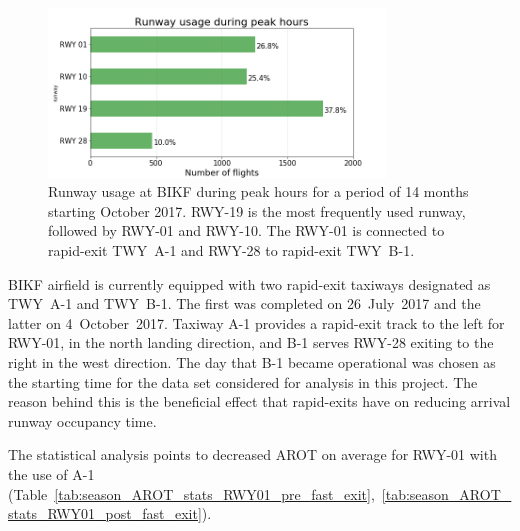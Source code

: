\begin{figure}[h]
    \centering
    \includegraphics[width=0.8\textwidth]{graphics/fig_runway_usage_peak.png}
    \caption[Runway usage at BIKF during peak hours]{Runway usage at BIKF during peak hours for a period of 14 months starting October 2017. RWY-19 is the most frequently used runway, followed by RWY-01 and RWY-10. The RWY-01 is connected to rapid-exit TWY~A-1 and RWY-28 to rapid-exit TWY~B-1.}
    \label{fig:runway_usage_peak}
\end{figure}

BIKF airfield is currently equipped with two rapid-exit taxiways designated as TWY~A-1 and TWY~B-1. The first was completed on 26~July~2017 and the latter on 4~October~2017. Taxiway A-1 provides a rapid-exit track to the left for RWY-01, in the north landing direction, and B-1 serves RWY-28 exiting to the right in the west direction. The day that B-1 became operational was chosen as the starting time for the data set considered for analysis in this project. The reason behind this is the beneficial effect that rapid-exits have on reducing arrival runway occupancy time. 

The statistical analysis points to decreased AROT on average for RWY-01 with the use of A-1 (Table~\ref{tab:season_AROT_stats_RWY01_pre_fast_exit},~\ref{tab:season_AROT_stats_RWY01_post_fast_exit}). 

\begin{table}[h]
\centering
{}
\caption[AROTs RWY-01 without rapid-exit by season]{AROTs for runway RWY-01 without rapid-exit, by season. The count is the number of landings during peak hours from July 2017 to November 2018.}
\label{tab:season_AROT_stats_RWY01_pre_fast_exit}
\end{table}

